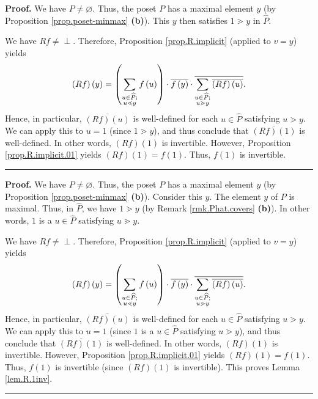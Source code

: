 \documentclass[numbers=enddot,12pt,final,onecolumn,notitlepage]{scrartcl}%
\theoremstyle{definition}
\newenvironment{verlong}{}{}
\newenvironment{vershort}{}{}
\newcommand{\undf}{\operatorname*{\bot}}
\newenvironment{proof}[1][Proof]{\noindent\textbf{#1.} }{\ \rule{0.5em}{0.5em}}
\let\sumnonlimits\sum
\renewcommand{\sum}{\sumnonlimits\limits}
\begin{document}
\begin{vershort}
\begin{proof}
We have $P\neq\varnothing$. Thus, the poset $P$ has a maximal element $y$ (by
Proposition \ref{prop.poset-minmax} \textbf{(b)}). This $y$ then satisfies
$1\gtrdot y$ in $\widehat{P}$.

We have $Rf\neq\undf$. Therefore, Proposition \ref{prop.R.implicit} (applied
to $v=y$) yields%
\[
\left(  Rf\right)  \left(  y\right)  =\left(  \sum\limits_{\substack{u\in
\widehat{P};\\u\lessdot y}}f\left(  u\right)  \right)  \cdot\overline{f\left(
y\right)  }\cdot\overline{\sum\limits_{\substack{u\in\widehat{P};\\u\gtrdot
y}}\overline{\left(  Rf\right)  \left(  u\right)  }}.
\]
Hence, in particular, $\overline{\left(  Rf\right)  \left(  u\right)  }$ is
well-defined for each $u\in\widehat{P}$ satisfying $u\gtrdot y$. We can apply
this to $u=1$ (since $1 \gtrdot y$), and thus conclude that $\overline{\left(
Rf\right)  \left(  1\right)  }$ is well-defined. In other words, $\left(
Rf\right)  \left(  1\right)  $ is invertible. However, Proposition
\ref{prop.R.implicit.01} yields $\left(  Rf\right)  \left(  1\right)
=f\left(  1\right)  $. Thus, $f\left(  1\right)  $ is invertible.
\end{proof}
\end{vershort}

\begin{verlong}
\begin{proof}
We have $P\neq\varnothing$. Thus, the poset $P$ has a maximal element $y$ (by
Proposition \ref{prop.poset-minmax} \textbf{(b)}). Consider this $y$. The
element $y$ of $P$ is maximal. Thus, in $\widehat{P}$, we have $1\gtrdot y$
(by Remark \ref{rmk.Phat.covers} \textbf{(b)}). In other words, $1$ is a
$u\in\widehat{P}$ satisfying $u\gtrdot y$.

We have $Rf\neq\undf$. Therefore, Proposition \ref{prop.R.implicit} (applied
to $v=y$) yields%
\[
\left(  Rf\right)  \left(  y\right)  =\left(  \sum\limits_{\substack{u\in
\widehat{P};\\u\lessdot y}}f\left(  u\right)  \right)  \cdot\overline{f\left(
y\right)  }\cdot\overline{\sum\limits_{\substack{u\in\widehat{P};\\u\gtrdot
y}}\overline{\left(  Rf\right)  \left(  u\right)  }}.
\]
Hence, in particular, $\overline{\left(  Rf\right)  \left(  u\right)  }$ is
well-defined for each $u\in\widehat{P}$ satisfying $u\gtrdot y$. We can apply
this to $u=1$ (since $1$ is a $u\in\widehat{P}$ satisfying $u\gtrdot y$), and
thus conclude that $\overline{\left(  Rf\right)  \left(  1\right)  }$ is
well-defined. In other words, $\left(  Rf\right)  \left(  1\right)  $ is
invertible. However, Proposition \ref{prop.R.implicit.01} yields $\left(
Rf\right)  \left(  1\right)  =f\left(  1\right)  $. Thus, $f\left(  1\right)
$ is invertible (since $\left(  Rf\right)  \left(  1\right)  $ is invertible).
This proves Lemma \ref{lem.R.1inv}.
\end{proof}
\end{verlong}
\end{document}
